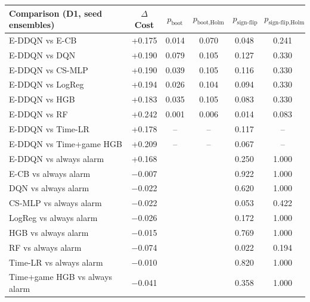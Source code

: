 \begin{tabular}{lccccc}
\toprule
Comparison (D1, seed ensembles) & $\Delta$Cost & $p_{\text{boot}}$ & $p_{\text{boot,Holm}}$ & $p_{\text{sign-flip}}$ & $p_{\text{sign-flip,Holm}}$ \\
\midrule
E-DDQN vs E-CB & +0.175 & 0.014 & 0.070 & 0.048 & 0.241 \\
E-DDQN vs DQN & +0.190 & 0.079 & 0.105 & 0.127 & 0.330 \\
E-DDQN vs CS-MLP & +0.190 & 0.039 & 0.105 & 0.116 & 0.330 \\
E-DDQN vs LogReg & +0.194 & 0.026 & 0.104 & 0.094 & 0.330 \\
E-DDQN vs HGB & +0.183 & 0.035 & 0.105 & 0.083 & 0.330 \\
E-DDQN vs RF & +0.242 & 0.001 & 0.006 & 0.014 & 0.083 \\
E-DDQN vs Time-LR & +0.178 & -- & -- & 0.117 & -- \\
E-DDQN vs Time+game HGB & +0.209 & -- & -- & 0.067 & -- \\
E-DDQN vs always alarm & +0.168 &  &  & 0.250 & 1.000 \\
E-CB vs always alarm & $-$0.007 &  &  & 0.922 & 1.000 \\
DQN vs always alarm & $-$0.022 &  &  & 0.620 & 1.000 \\
CS-MLP vs always alarm & $-$0.022 &  &  & 0.053 & 0.422 \\
LogReg vs always alarm & $-$0.026 &  &  & 0.172 & 1.000 \\
HGB vs always alarm & $-$0.015 &  &  & 0.769 & 1.000 \\
RF vs always alarm & $-$0.074 &  &  & 0.022 & 0.194 \\
Time-LR vs always alarm & $-$0.010 &  &  & 0.820 & 1.000 \\
Time+game HGB vs always alarm & $-$0.041 &  &  & 0.358 & 1.000 \\
\bottomrule
\end{tabular}
